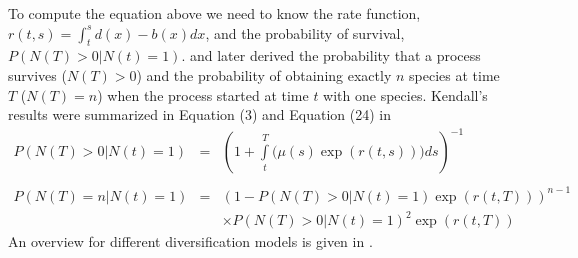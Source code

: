 To compute the equation above we need to know the rate function, $r(t,s) = \int_t^s d(x)-b(x) dx$, and the probability of survival, $P(N(T)\!>\!0|N(t)\!=\!1)$.
\cite{Yule1925} and later \cite{Kendall1948} derived the probability that a process survives ($N(T) > 0$) and the probability of obtaining exactly $n$ species at time $T$ ($N(T) = n$) when the process started at time $t$ with one species.
Kendall's results were summarized in Equation (3) and Equation (24) in \cite{Nee1994b}
\begin{eqnarray}
P(N(T)\!>\!0|N(t)\!=\!1) & = & \left(1+\int\limits_t^{T} \bigg(\mu(s) \exp(r(t,s))\bigg) ds\right)^{-1} \label{eq:survival} \\ \nonumber \\
P(N(T)\!=\!n|N(t)\!=\!1) & = & (1-P(N(T)\!>\!0|N(t)\!=\!1)\exp(r(t,T)))^{n-1} \nonumber\\
& & \times P(N(T)\!>\!0|N(t)\!=\!1)^2 \exp(r(t,T)) \label{eq:N} %
\end{eqnarray}
An overview for different diversification models is given in \cite{Hoehna2015a}.




